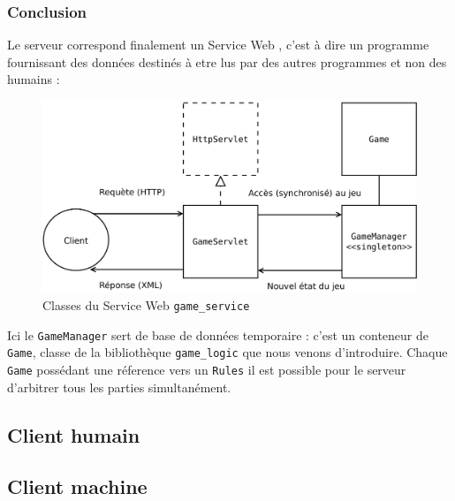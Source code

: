 \subsubsection{Conclusion}
Le serveur correspond finalement un \og Service Web \fg{}, c'est à dire un programme fournissant des données destinés à etre lus par des autres programmes et non des humains :
\begin{figure}[H] 
\centering
\includegraphics[width=\textwidth]{files/env/game_service} 
\caption{Classes du Service Web \texttt{game\_service}} 
\label{game_service}
\end{figure}
Ici le \texttt{GameManager} sert de base de données temporaire : c'est un conteneur de \texttt{Game}, classe de la bibliothèque \texttt{game\_logic} que nous venons d'introduire. Chaque \texttt{Game} possédant une réference vers un \texttt{Rules} il est possible pour le serveur d'arbitrer tous les parties simultanément.

\subsection{Client humain}

\subsection{Client machine}